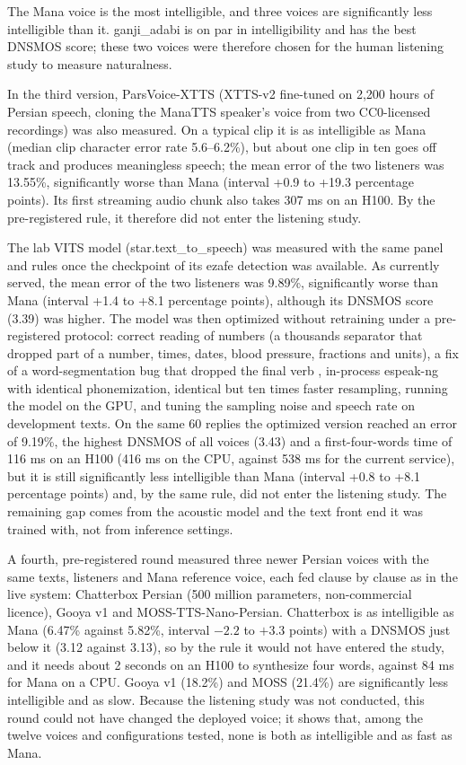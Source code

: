 The Mana voice is the most intelligible, and three voices are significantly less
intelligible than it. ganji\_adabi is on par in intelligibility and has the best DNSMOS
score; these two voices were therefore chosen for the human listening study to measure
naturalness.

In the third version, ParsVoice-XTTS (XTTS-v2 fine-tuned on 2,200 hours of Persian speech,
cloning the ManaTTS speaker's voice from two CC0-licensed recordings) was also measured. On
a typical clip it is as intelligible as Mana (median clip character error rate 5.6--6.2\%),
but about one clip in ten goes off track and produces meaningless speech; the mean error of
the two listeners was 13.55\%, significantly worse than Mana (interval +0.9 to +19.3
percentage points). Its first streaming audio chunk also takes 307 ms on an H100. By the
pre-registered rule, it therefore did not enter the listening study.

The lab VITS model (star.text\_to\_speech) was measured with the same panel and rules once
the checkpoint of its ezafe detection was available. As currently served, the mean error of
the two listeners was 9.89\%, significantly worse than Mana (interval +1.4 to +8.1
percentage points), although its DNSMOS score (3.39) was higher. The model was then
optimized without retraining under a pre-registered protocol: correct reading of numbers (a
thousands separator that dropped part of a number, times, dates, blood pressure, fractions
and units), a fix of a word-segmentation bug that dropped the final verb ,
in-process espeak-ng with identical phonemization, identical but ten times faster
resampling, running the model on the GPU, and tuning the sampling noise and speech rate on
development texts. On the same 60 replies the optimized version reached an error of
9.19\%, the highest DNSMOS of all voices (3.43) and a first-four-words time of 116 ms on an
H100 (416 ms on the CPU, against 538 ms for the current service), but it is still
significantly less intelligible than Mana (interval +0.8 to +8.1 percentage points) and,
by the same rule, did not enter the listening study. The remaining gap comes from the
acoustic model and the text front end it was trained with, not from inference settings.

A fourth, pre-registered round measured three newer Persian voices with the same texts,
listeners and Mana reference voice, each fed clause by clause as in the live system:
Chatterbox Persian (500 million parameters, non-commercial licence), Gooya v1 and
MOSS-TTS-Nano-Persian. Chatterbox is as intelligible as Mana (6.47\% against 5.82\%, interval
$-2.2$ to $+3.3$ points) with a DNSMOS just below it (3.12 against 3.13), so by the rule it
would not have entered the study, and it needs about 2 seconds on an H100 to synthesize four
words, against 84 ms for Mana on a CPU. Gooya v1 (18.2\%) and MOSS (21.4\%) are significantly
less intelligible and as slow. Because the listening study was not conducted, this round could
not have changed the deployed voice; it shows that, among the twelve voices and configurations
tested, none is both as intelligible and as fast as Mana.

